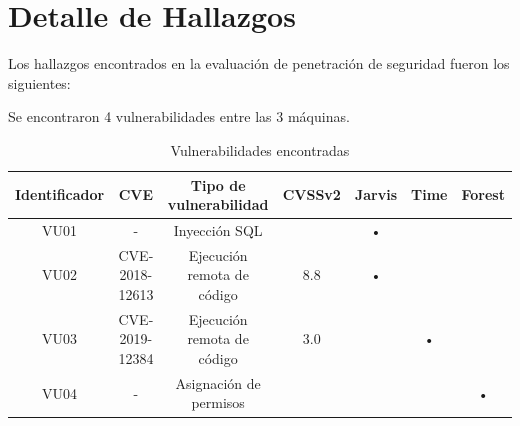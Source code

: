 \documentclass[a4paper]{article}
\begin{document}
    \section{Detalle de Hallazgos}
        \large{Los hallazgos encontrados en la evaluación de penetración de seguridad fueron los siguientes:}
        \par
        \large{Se encontraron 4 vulnerabilidades entre las 3 máquinas.}
        \par
        \begin{table}[H]
            \centering
                \begin{tabular}{|c|c|c|c|c|c|c|}\hline
                    Identificador & CVE & Tipo de vulnerabilidad & CVSSv2 & Jarvis & Time & Forest \\ \hline
                    VU01 & - & Inyección SQL & & • & &  \\ \hline
                    VU02 & CVE-2018-12613 & Ejecución remota de código & 8.8 & • & &  \\ \hline
                    VU03 & CVE-2019-12384 & Ejecución remota de código & 3.0 & & • &  \\ \hline
                    VU04 & - & Asignación de permisos & & & & • \\ \hline
                \end{tabular}
                \caption{Vulnerabilidades encontradas}
        \end{table}
        \par
        

    \clearpage
    
    
    
    \clearpage
\end{document}
